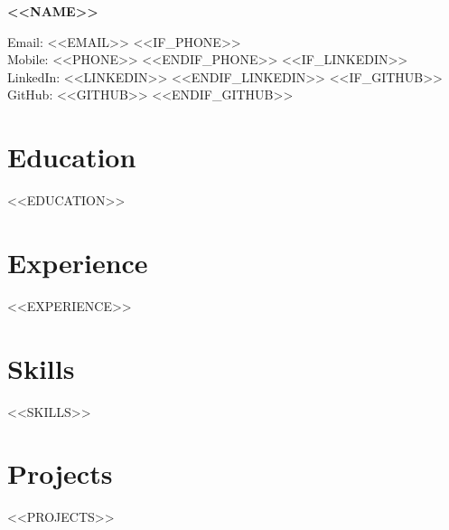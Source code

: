 \documentclass[11pt]{article} %
\begin{document}
\begin{center}
	\begin{minipage}{0.5\textwidth}
		{\Huge\bfseries
			<<NAME>>
		}
	\end{minipage} \hfill
	\begin{minipage}{0.4\textwidth}
		\raggedleft
		Email: <<EMAIL>> <<IF_PHONE>>\\
		Mobile: <<PHONE>> <<ENDIF_PHONE>> <<IF_LINKEDIN>>\\
		LinkedIn: <<LINKEDIN>> <<ENDIF_LINKEDIN>> <<IF_GITHUB>>\\
		GitHub: <<GITHUB>> <<ENDIF_GITHUB>>
	\end{minipage}
\end{center}

\section{Education}
<<EDUCATION>>

\section{Experience}
<<EXPERIENCE>>

\section{Skills}
<<SKILLS>>

\section{Projects}
<<PROJECTS>>
\end{document}
